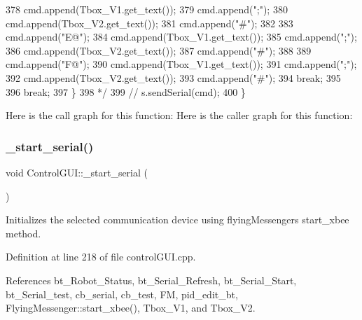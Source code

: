 \begin{DoxyCode}
378 \textcolor{comment}{        cmd.append(Tbox\_V1.get\_text());}
379 \textcolor{comment}{        cmd.append(";");}
380 \textcolor{comment}{        cmd.append(Tbox\_V2.get\_text());}
381 \textcolor{comment}{        cmd.append("#");}
382 \textcolor{comment}{}
383 \textcolor{comment}{        cmd.append("E@");}
384 \textcolor{comment}{        cmd.append(Tbox\_V1.get\_text());}
385 \textcolor{comment}{        cmd.append(";");}
386 \textcolor{comment}{        cmd.append(Tbox\_V2.get\_text());}
387 \textcolor{comment}{        cmd.append("#");}
388 \textcolor{comment}{}
389 \textcolor{comment}{        cmd.append("F@");}
390 \textcolor{comment}{        cmd.append(Tbox\_V1.get\_text());}
391 \textcolor{comment}{        cmd.append(";");}
392 \textcolor{comment}{        cmd.append(Tbox\_V2.get\_text());}
393 \textcolor{comment}{        cmd.append("#");}
394 \textcolor{comment}{        break;}
395 \textcolor{comment}{}
396 \textcolor{comment}{        break;}
397 \textcolor{comment}{    \}}
398 \textcolor{comment}{    */}
399     \textcolor{comment}{// s.sendSerial(cmd);}
400 \}
\end{DoxyCode}
Here is the call graph for this function\+:
Here is the caller graph for this function\+:
\mbox{\label{class_control_g_u_i_ab56193e598145a8ad679029abaf0fd46}} 
\subsubsection{\texorpdfstring{\+\_\+start\+\_\+serial()}{\_start\_serial()}}
{\footnotesize\ttfamily void Control\+G\+U\+I\+::\+\_\+start\+\_\+serial (\begin{DoxyParamCaption}{ }\end{DoxyParamCaption})}



Initializes the selected communication device using flying\+Messenger\textquotesingle{}s start\+\_\+xbee method. 



Definition at line 218 of file control\+G\+U\+I.\+cpp.



References bt\+\_\+\+Robot\+\_\+\+Status, bt\+\_\+\+Serial\+\_\+\+Refresh, bt\+\_\+\+Serial\+\_\+\+Start, bt\+\_\+\+Serial\+\_\+test, cb\+\_\+serial, cb\+\_\+test, FM, pid\+\_\+edit\+\_\+bt, Flying\+Messenger\+::start\+\_\+xbee(), Tbox\+\_\+\+V1, and Tbox\+\_\+\+V2.



